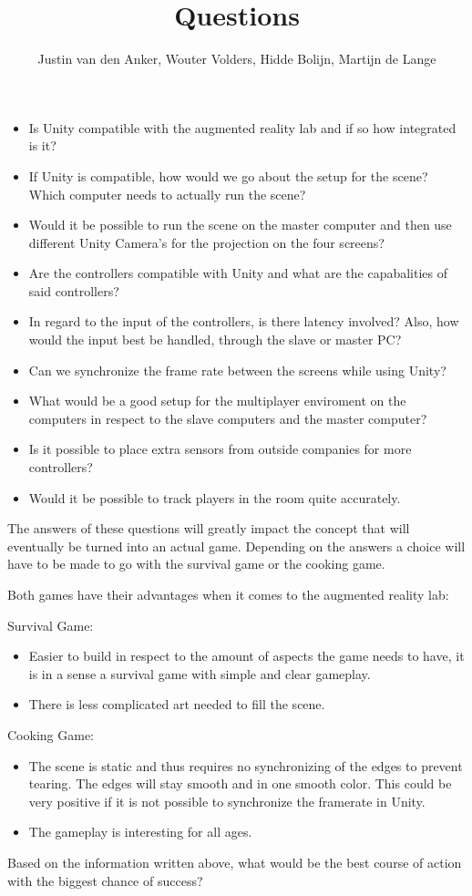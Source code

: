 \documentclass[10pt,a4paper]{article}
\author{Justin van den Anker, Wouter Volders, Hidde Bolijn, Martijn de Lange}
\title{Questions}
\begin{document}
\maketitle

\begin{itemize}
\item Is Unity compatible with the augmented reality lab and if so how integrated is it?
\item If Unity is compatible, how would we go about the setup for the scene? Which computer needs to actually run the scene?
\item Would it be possible to run the scene on the master computer and then use different Unity Camera's for the projection on the four screens?
\item Are the controllers compatible with Unity and what are the capabalities of said controllers?
\item In regard to the input of the controllers, is there latency involved? Also, how would the input best be handled, through the slave or master PC?
\item Can we synchronize the frame rate between the screens while using Unity?
\item What would be a good setup for the multiplayer enviroment on the computers in respect to the slave computers and the master computer?
\item Is it possible to place extra sensors from outside companies for more controllers?
\item Would it be possible to track players in the room quite accurately.

\end{itemize}
The answers of these questions will greatly impact the concept that will eventually be turned into an actual game. Depending on the answers a choice will have to be made to go with the survival game or the cooking game.

Both games have their advantages when it comes to the augmented reality lab:

Survival Game:
\begin{itemize}
\item Easier to build in respect to the amount of aspects the game needs to have, it is in a sense a survival game with simple and clear gameplay.
\item There is less complicated art needed to fill the scene.
\end{itemize}

Cooking Game:
\begin{itemize}
\item The scene is static and thus requires no synchronizing of the edges to prevent tearing. The edges will stay smooth and in one smooth color. This could be very positive if it is not possible to synchronize the framerate in Unity.
\item The gameplay is interesting for all ages.
\end{itemize}

Based on the information written above, what would be the best course of action with the biggest chance of success?
\end{document}
